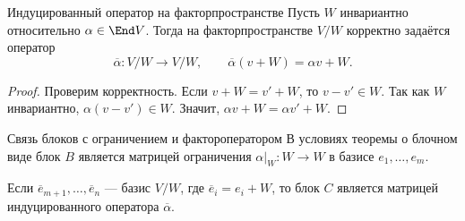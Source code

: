 \begin{Definition}{Индуцированный оператор на факторпространстве}{}
	Пусть $W$ инвариантно относительно $\alpha\in\End V$.
	Тогда на факторпространстве $V/W$ корректно задаётся оператор
	\[
	\overline{\alpha}\colon V/W\to V/W,
	\qquad
	\overline{\alpha}(v+W)=\alpha v+W.
	\]
\end{Definition}

\begin{proof}
	Проверим корректность. Если $v+W=v'+W$, то $v-v'\in W$.
	Так как $W$ инвариантно, $\alpha(v-v')\in W$.
	Значит, $\alpha v+W=\alpha v'+W$.
\end{proof}

\begin{Remark}{Связь блоков с ограничением и фактороператором}{}
	В условиях теоремы о блочном виде блок $B$ является матрицей ограничения
	$\alpha|_W\colon W\to W$ в базисе $e_1,\ldots,e_m$.
	
	Если $\overline e_{m+1},\ldots,\overline e_n$ --- базис $V/W$, где
	$\overline e_i=e_i+W$, то блок $C$ является матрицей индуцированного оператора
	$\overline{\alpha}$.
\end{Remark}

